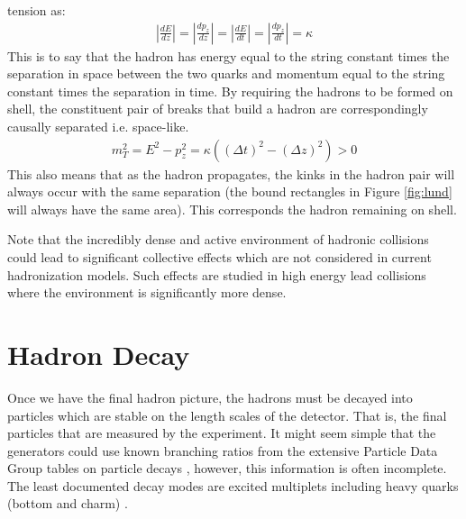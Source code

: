 tension as: 
\begin{align*}
\left |\frac{dE}{dz}\right|  = \left|\frac{dp_z}{dz}\right| = 
\left|\frac{dE}{dt}\right| = \left|\frac{dp_z}{dt}\right|  = \kappa
\end{align*}
This is to say that the hadron has energy equal to the string constant times the separation in space between the 
two quarks and momentum equal to the string constant times the separation in time. By requiring the hadrons
 to be formed on shell, the constituent pair of breaks that build a hadron are correspondingly
 causally separated i.e. space-like. 
\begin{align*}
m_T^2 = E^2 - p_z^2 = \kappa((\Delta t)^2 - (\Delta z)^2) > 0 
\end{align*}
This also means that as the hadron propagates, the kinks in the hadron pair will always occur with the same separation
(the bound rectangles in Figure \ref{fig:lund} will always have the same area). This corresponds the hadron remaining on shell.

Note that the incredibly dense and active environment of hadronic collisions
could lead to significant collective effects which are not considered in current hadronization models. Such effects are studied in high energy lead collisions where the environment is significantly more dense. 

\section{Hadron Decay}

Once we have the final hadron picture, the hadrons must be decayed into particles which are stable on the length scales of the detector. That is,
the final particles that are measured by the experiment.  It might seem simple that the generators could use
 known branching ratios from the extensive Particle Data Group tables on particle decays \cite{pdgtables}, however, this information is often incomplete. The least documented decay modes are excited  multiplets including heavy quarks (bottom and charm) \cite{mcreview}.

